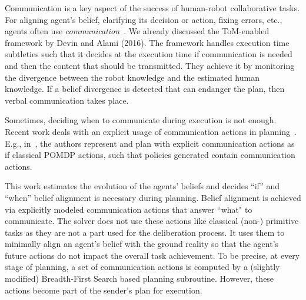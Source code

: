 \documentclass[letterpaper]{article} %
\begin{document}
Communication is a key aspect of the success of human-robot collaborative tasks.
For aligning agent's belief, clarifying its decision or action, fixing errors, etc., agents often use \textit{communication}~\cite{tellex2014asking,sebastiani2017dealing}. We already discussed the ToM-enabled framework by Devin and Alami (2016). The framework handles execution time subtleties such that it decides at the execution time if communication is needed and then the content that should be transmitted. 
They achieve it by monitoring the divergence between the robot knowledge and the estimated human knowledge. If a belief divergence is detected that can endanger the plan, then verbal communication takes place. 

Sometimes, deciding when to communicate during execution is not enough. Recent work deals with an explicit usage of communication actions in planning~\cite{BuisanSA20,nikolaidis2018planning,roncone2017transparent,sanelli2017short,UnhelkarLS20}. 
E.g., in~\cite{roncone2017transparent,UnhelkarLS20}, the authors represent and plan with explicit communication actions as if classical POMDP actions, such that policies generated contain communication actions.

This work estimates the evolution of the agents' beliefs and decides ``if'' and ``when'' belief alignment is necessary during planning. Belief alignment is achieved via explicitly modeled communication actions that answer ``what" to communicate. The solver does not use these actions like classical (non-) primitive tasks as they are not a part used for the deliberation process. It uses them to minimally align an agent's belief with the ground reality so that the agent's future actions do not impact the overall task achievement. To be precise, at every stage of planning, a set of communication actions is computed by a (slightly modified) Breadth-First Search based planning subroutine. However, these actions become part of the sender's plan for execution.    







\end{document}
